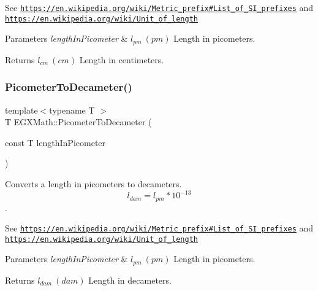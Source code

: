 See \href{https://en.wikipedia.org/wiki/Metric_prefix#List_of_SI_prefixes}{\tt https\+://en.\+wikipedia.\+org/wiki/\+Metric\+\_\+prefix\#\+List\+\_\+of\+\_\+\+S\+I\+\_\+prefixes} and \href{https://en.wikipedia.org/wiki/Unit_of_length}{\tt https\+://en.\+wikipedia.\+org/wiki/\+Unit\+\_\+of\+\_\+length} 
\begin{DoxyParams}{Parameters}
{\em length\+In\+Picometer} & $ l_{pm}\ (pm)$ Length in picometers. \\
\hline
\end{DoxyParams}
\begin{DoxyReturn}{Returns}
$ l_{cm}\ (cm)$ Length in centimeters. 
\end{DoxyReturn}
\mbox{\label{group___e_g_x_math-_conversions-_length_conversions-_picometer-_s_i_gac3123f93cc73d11cefa26073dc2c46a5}} 
\subsubsection{\texorpdfstring{Picometer\+To\+Decameter()}{PicometerToDecameter()}}
{\footnotesize\ttfamily template$<$typename T $>$ \\
T E\+G\+X\+Math\+::\+Picometer\+To\+Decameter (\begin{DoxyParamCaption}\item[{const T}]{length\+In\+Picometer }\end{DoxyParamCaption})}



Converts a length in picometers to decameters. \[ l_{dam}=l_{pm} * 10^{-13} \]. 

See \href{https://en.wikipedia.org/wiki/Metric_prefix#List_of_SI_prefixes}{\tt https\+://en.\+wikipedia.\+org/wiki/\+Metric\+\_\+prefix\#\+List\+\_\+of\+\_\+\+S\+I\+\_\+prefixes} and \href{https://en.wikipedia.org/wiki/Unit_of_length}{\tt https\+://en.\+wikipedia.\+org/wiki/\+Unit\+\_\+of\+\_\+length} 
\begin{DoxyParams}{Parameters}
{\em length\+In\+Picometer} & $ l_{pm}\ (pm)$ Length in picometers. \\
\hline
\end{DoxyParams}
\begin{DoxyReturn}{Returns}
$ l_{dam}\ (dam)$ Length in decameters. 
\end{DoxyReturn}
\mbox{\label{group___e_g_x_math-_conversions-_length_conversions-_picometer-_s_i_gab0d70362fb21996562efb9c22d9bacf4}} 
